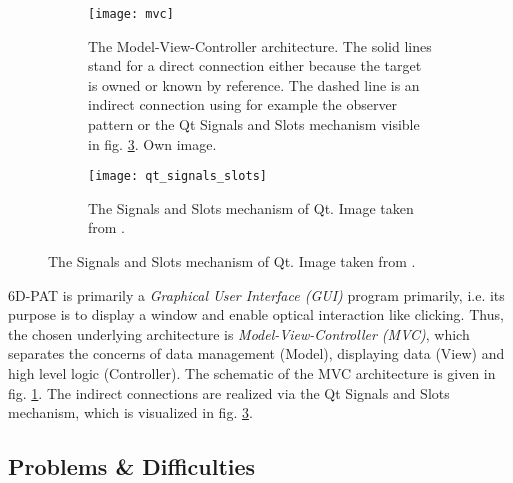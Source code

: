\begin{figure}[!tbp]
\end{figure} 

\begin{figure}[!tbp]
	\centering
	\begin{subfigure}[t]{0.47\textwidth}
		\centering
    	\texttt{[image: mvc]}
    	\caption{The Model-View-Controller architecture. The solid lines stand for a direct connection either because the target is owned or known by reference. The dashed line is an indirect connection using for example the observer pattern or the Qt Signals and Slots mechanism visible in fig. \ref{fig:qt_signals_slots}. Own image.}
    	\label{fig:mvc}
	\end{subfigure}
	\hfill
	\begin{subfigure}[t]{0.47\textwidth}
	\centering
    	\texttt{[image: qt\_signals\_slots]}
    	\caption{The Signals and Slots mechanism of Qt. Image taken from \cite{qt_signals_and_slots}.}
    	\label{fig:qt_signals_slots}
	\end{subfigure}
\end{figure} 

6D-PAT is primarily a \textit{Graphical User Interface (GUI)} program primarily, i.e. its purpose is to display a window and enable optical interaction like clicking. Thus, the chosen underlying architecture is \textit{Model-View-Controller (MVC)}, which separates the concerns of data management (Model), displaying data (View) and high level logic (Controller). The schematic of the MVC architecture is given in fig. \ref{fig:mvc}. The indirect connections are realized via the Qt Signals and Slots mechanism, which is visualized in fig. \ref{fig:qt_signals_slots}.



\subsection{Problems \& Difficulties} \label{section:6dpat_difficulties}



